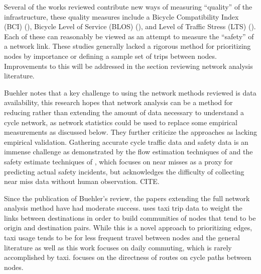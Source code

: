 \documentclass[11pt]{article} %
\begin{document}
Several of the works reviewed contribute new ways of measuring ``quality'' of the infrastructure, these quality measures include a Bicycle Compatibility Index (BCI) (\cite{klobucar2007network}),  Bicycle Level of Service (BLOS) (\cite{lowry2012assessment}), and Level of Traffic Stress (LTS) (\cite{mekuria2012low}). Each of these can reasonably be viewed as an attempt to measure the ``safety'' of a network link. These studies generally lacked a rigorous method for prioritizing nodes by importance or defining a sample set of trips between nodes. Improvements to this will be addressed in the section reviewing network analysis literature. 

Buehler notes that a key challenge to using the network methods reviewed is data availability, this research hopes that network analysis can be a method for reducing rather than extending the amount of data necessary to understand a cycle network, as network statistics could be used to replace some empirical measurements as discussed below.  They further criticize the approaches as lacking empirical validation. Gathering accurate cycle traffic data and safety data is an immense challenge as demonstrated by the flow estimation techniques of \cite{gosse2014estimating} and the safety estimate techniques of \cite{puchades2018role}, which focuses on near misses as a proxy for predicting actual safety incidents, but acknowledges the difficulty of collecting near miss data without human observation. CITE. 

Since the publication of Buehler's review, the papers extending the full network analysis method have had moderate success. \cite{akbarzadeh2018designing} uses taxi trip data to weight the links between destinations in order to build communities of nodes that tend to be origin and destination pairs. While this is a novel approach to prioritizing edges, taxi usage tends to be for less frequent travel between nodes and the general literature as well as this work focuses on daily commuting, which is rarely accomplished by taxi. \cite{boisjoly2019bicycle} focuses on the directness of routes on cycle paths between nodes. 
\end{document}
